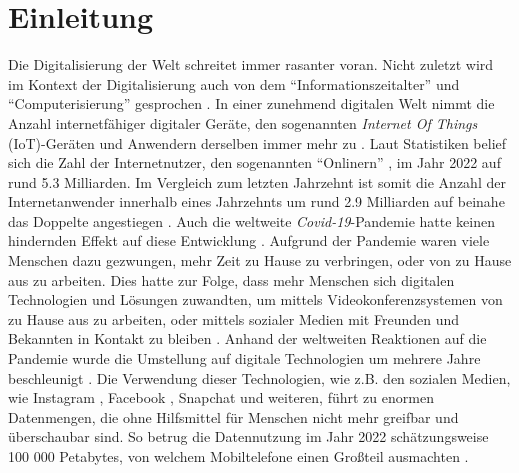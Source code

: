 \section{Einleitung}
\label{sec1:intro}
Die Digitalisierung der Welt schreitet immer rasanter voran. Nicht zuletzt wird im Kontext der Digitalisierung auch von dem \enquote{Informationszeitalter} und \enquote{Computerisierung} gesprochen \cite{gabler-digitalisierung}.
In einer zunehmend digitalen Welt nimmt die Anzahl internetfähiger digitaler Geräte, den sogenannten \textit{Internet Of Things} (IoT)-Geräten und Anwendern derselben immer mehr zu \cite{statista-iot-devices}.
Laut Statistiken belief sich die Zahl der Internetnutzer, den sogenannten \enquote{Onlinern} \cite{statista-onliner-2022}, im Jahr 2022 auf rund 5.3 Milliarden.
Im Vergleich zum letzten Jahrzehnt ist somit die Anzahl der Internetanwender innerhalb eines Jahrzehnts um rund 2.9 Milliarden auf beinahe das Doppelte angestiegen \cite{statista-onliner-2022}.
Auch die weltweite \textit{Covid-19}-Pandemie hatte keinen hindernden Effekt auf diese Entwicklung \cite{mckinsey-digitalization-covid}.
Aufgrund der Pandemie waren viele Menschen dazu gezwungen, mehr Zeit zu Hause zu verbringen, oder von zu Hause aus zu arbeiten.
Dies hatte zur Folge, dass mehr Menschen sich digitalen Technologien und Lösungen zuwandten, um mittels Videokonferenzsystemen von zu Hause aus zu arbeiten, oder mittels sozialer Medien mit Freunden und Bekannten in Kontakt zu bleiben \cite{mckinsey-digitalization-covid, statista-covid-social-media-use}.
Anhand der weltweiten Reaktionen auf die Pandemie wurde die Umstellung auf digitale Technologien um mehrere Jahre beschleunigt \cite{mckinsey-digitalization-covid}.
Die Verwendung dieser Technologien, wie z.B. den sozialen Medien, wie Instagram \cite{instagram}, Facebook \cite{facebook}, Snapchat \cite{snapchat} und weiteren, führt zu enormen Datenmengen, die ohne Hilfsmittel für Menschen nicht mehr greifbar und überschaubar sind.
So betrug die Datennutzung im Jahr 2022 schätzungsweise 100 000 Petabytes, von welchem Mobiltelefone einen Großteil ausmachten \cite{global-mobile-data-usage}.

